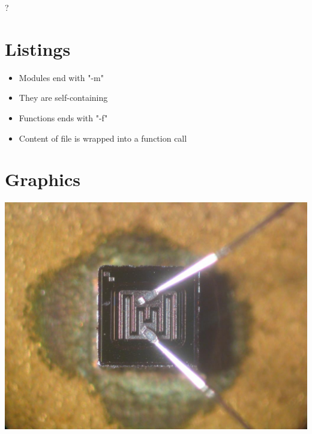 {
\begin{center}
\vspace{-10em}
\fontsize{160}{200}\selectfont ?
\end{center}
}


\section{Listings}


{
\begin{itemize}
\item Modules end with "-m"
\item They are self-containing
\end{itemize}

}


{
\begin{itemize}
\item Functions ends with "-f"
\item Content of file is wrapped into a function call
\end{itemize}

}


{
\tiny{}
\begin{multicols}{2}

\end{multicols}
}


\section{Graphics}


{
\begin{center}
\includegraphics[scale=0.25]{pic/transistor}
\end{center}
}


